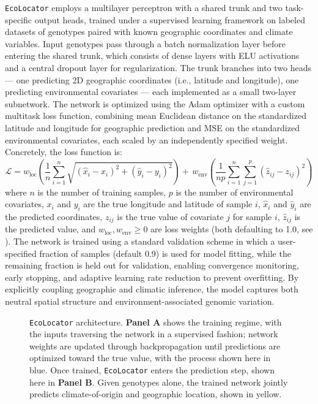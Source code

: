 \documentclass[]{article}
\newcommand{\ecolocator}{\texttt{EcoLocator}\xspace}
\begin{document}
\ecolocator employs a multilayer perceptron with a shared trunk 
and two task-specific output heads, trained under a supervised 
learning framework on labeled datasets of genotypes paired with 
known geographic coordinates and climate variables. Input genotypes 
pass through a batch normalization layer before entering the shared 
trunk, which consists of dense layers with ELU activations and a 
central dropout layer for regularization. The trunk branches into 
two heads --- one predicting 2D geographic coordinates (i.e., latitude and longitude), one predicting 
environmental covariates --- each implemented as a small two-layer subnetwork. 
The network is optimized using the Adam optimizer with a custom multitask 
loss function, combining mean Euclidean distance on the standardized 
latitude and longitude for geographic 
prediction and MSE on the standardized environmental covariates, each scaled by an 
independently specified weight. Concretely, the loss function is:
\begin{equation} \label{eq:1}
    \mathcal{L} = w_{\text{loc}} \left( \frac{1}{n} \sum_{i=1}^{n}
    \sqrt{(\hat{x}_i - x_i)^2 + (\hat{y}_i - y_i)^2} \right)
    + \, w_{\text{env}} \left( \frac{1}{np} \sum_{i=1}^{n} \sum_{j=1}^{p}
    (\hat{z}_{ij} - z_{ij})^2 \right)
\end{equation}
where $n$ is the number of training samples, $p$ is the number of environmental
covariates, $x_i$ and $y_i$ are the true longitude and latitude of sample $i$,
$\hat{x}_i$ and $\hat{y}_i$ are the predicted coordinates, $z_{ij}$ is the true
value of covariate $j$ for sample $i$, $\hat{z}_{ij}$ is the predicted value,
and $w_{\text{loc}}, w_{\text{env}} \geq 0$ are loss
weights (both defaulting to 1.0, see ).
The network is trained using a standard validation scheme in which a user-specified 
fraction of samples (default 0.9) is used for model fitting, while the remaining fraction is 
held out for validation, enabling convergence monitoring, early stopping, 
and adaptive learning rate reduction to prevent overfitting. 
By explicitly coupling geographic and climatic inference, the model captures 
both neutral spatial structure and environment-associated genomic variation.


\begin{figure}[H]
    \caption{\ecolocator architecture. \textbf{Panel A} shows the training regime,
    with the inputs traversing the network in a supervised fashion; network weights 
    are updated through backpropagation until predictions are optimized toward the
    true value, with the process shown here in blue. Once trained, \ecolocator enters the prediction
    step, shown here in \textbf{Panel B}. Given genotypes alone, the trained network
    jointly predicts climate-of-origin and geographic location, shown in yellow. }
    \label{fig:architecture}
\end{figure}
\end{document}
